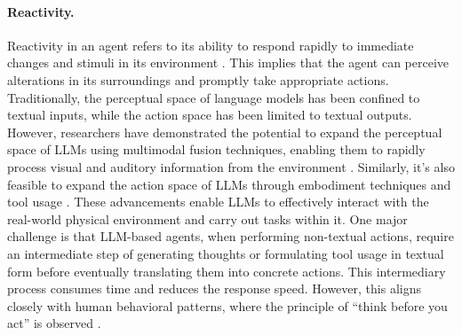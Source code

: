 \documentclass{article}
\begin{document}
\paragraph{Reactivity.}
Reactivity in an agent refers to its ability to respond rapidly to immediate changes and stimuli in its environment \cite{DBLP:journals/logcom/Goodwin95}. 
This implies that the agent can perceive alterations in its surroundings and promptly take appropriate actions.
Traditionally, the perceptual space of language models has been confined to textual inputs, while the action space has been limited to textual outputs. 
However, researchers have demonstrated the potential to expand the perceptual space of LLMs using multimodal fusion techniques, enabling them to rapidly process visual and auditory information from the environment \cite{DBLP:journals/corr/abs-2303-08774,zhu2023minigpt,DBLP:journals/corr/abs-2306-13549}. Similarly, it's also feasible to expand the action space of LLMs through embodiment techniques \cite{DBLP:conf/icml/DriessXSLCIWTVY23,DBLP:journals/corr/abs-2305-15021} and tool usage \cite{DBLP:journals/corr/abs-2302-04761,DBLP:journals/corr/abs-2304-08354}. 
These advancements enable LLMs to effectively interact with the real-world physical environment and carry out tasks within it.
One major challenge is that LLM-based agents, when performing non-textual actions, require an intermediate step of generating thoughts or formulating tool usage in textual form before eventually translating them into concrete actions. This intermediary process consumes time and reduces the response speed. 
However, this aligns closely with human behavioral patterns, where the principle of ``think before you act'' is observed \cite{brown2013beyond,DBLP:journals/corr/abs-2305-16338}.
\end{document}
